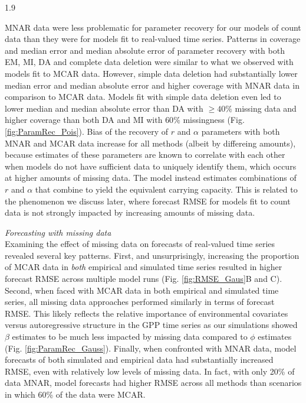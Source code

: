\documentclass[12pt,english]{article} %
\begin{document}
\begin{linenumbers}
\begin{spacing}{1.9}
\begin{flushleft}
\hspace{1em} MNAR data were less problematic for parameter recovery for our models of count data than they were for models fit to real-valued time series. Patterns in coverage and median error and median absolute error of parameter recovery with both EM, MI, DA and complete data deletion were similar to what we observed with models fit to MCAR data. However, simple data deletion had substantially lower median error and median absolute error and higher coverage with MNAR data in comparison to MCAR data. Models fit with simple data deletion even led to lower median and median absolute error than DA with $\geq40\%$ missing data and higher coverage than both DA and MI with $60\%$ missingness (Fig. \ref{fig:ParamRec_Pois}). Bias of the recovery of $r$ and $\alpha$ parameters with both MNAR and MCAR data increase for all methods (albeit by differeing amounts), because estimates of these parameters are known to correlate with each other when models do not have sufficient data to uniquely identify them, which occurs at higher amounts of missing data. The model instead estimates combinations of $r$ and $\alpha$ that combine to yield the equivalent carrying capacity. This is related to the phenomenon we discuss later, where forecast RMSE for models fit to count data is not strongly impacted by increasing amounts of missing data.

\textit{Forecasting with missing data} \\
\noindent Examining the effect of missing data on forecasts of real-valued time series revealed several key patterns. First, and unsurprisingly, increasing the proportion of MCAR data in \textit{both} empirical and simulated time series resulted in higher forecast RMSE across multiple model runs (Fig. \ref{fig:RMSE_Gaus}B and C). Second, when faced with MCAR data in both empirical and simulated time series, all missing data approaches performed similarly in terms of forecast RMSE. This likely reflects the relative importance of environmental covariates versus autoregressive structure in the GPP time series as our simulations showed $\beta$ estimates to be much less impacted by missing data compared to $\phi$ estimates (Fig. \ref{fig:ParamRec_Gauss}). Finally, when confronted with MNAR data, model forecasts of both simulated and empirical data had substantially increased RMSE, even with relatively low levels of missing data. In fact, with only 20\% of data MNAR, model forecasts had higher RMSE across all methods than scenarios in which 60\% of the data were MCAR.


\end{flushleft}
\end{spacing}
\end{linenumbers}
\end{document}
